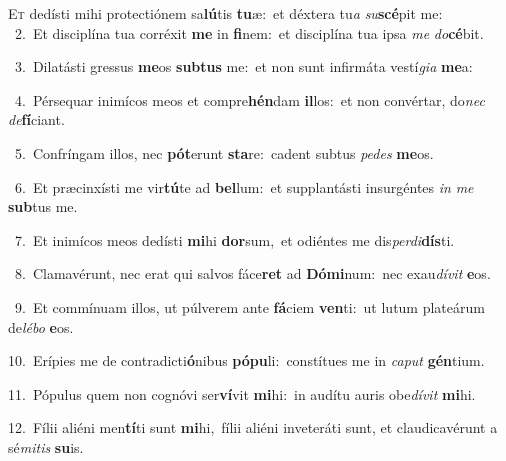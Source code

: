 \lettrine{\initial\textcolor{\initialcolor}{E}}{t} dedísti mihi protectiónem sa\-\textbf{lú}\-tis \textbf{tu}\-æ:~\star et déxtera tu\textit{a} \textit{su}\-\textbf{scé}pit me:\\
{\numbfont\textcolor{\numbcolor}{~2.}}~Et disciplína tua corréxit \textbf{me} in \textbf{fi}\-nem:~\star et disciplína tua ipsa \textit{me} \textit{do}\-\textbf{cé}bit.\par
{\numbfont\textcolor{\numbcolor}{~3.}}~Dilatásti gressus \textbf{me}\-os \textbf{sub}\-\textbf{tus} me:~\star et non sunt infirmáta vestí\-\textit{gi}\-\textit{a} \textbf{me}\-a:\par
{\numbfont\textcolor{\numbcolor}{~4.}}~Pérsequar inimícos meos et compre\-\textbf{hén}\-dam \textbf{il}\-los:~\star et non convértar, do\textit{nec} \textit{de}\-\textbf{fí}ciant.\par
{\numbfont\textcolor{\numbcolor}{~5.}}~Confríngam illos, nec \textbf{pót}\-erunt \textbf{sta}\-re:~\star cadent subtus \textit{pe}\-\textit{des} \textbf{me}\-os.\par
{\numbfont\textcolor{\numbcolor}{~6.}}~Et præcinxísti me vir\-\textbf{tú}\-te ad \textbf{bel}\-lum:~\star et supplantásti insurgéntes \textit{in} \textit{me} \textbf{sub}\-tus me.\par
{\numbfont\textcolor{\numbcolor}{~7.}}~Et inimícos meos dedísti \textbf{mi}\-hi \textbf{dor}\-sum,~\star et odiéntes me dis\-\textit{per}\-\textit{di}\textbf{dís}ti.\par
{\numbfont\textcolor{\numbcolor}{~8.}}~Clamavérunt, nec erat qui salvos fáce\textbf{ret} ad \textbf{Dó}\-\textbf{mi}num:~\star nec exau\-\textit{dí}\-\textit{vit} \textbf{e}\-os.\par
{\numbfont\textcolor{\numbcolor}{~9.}}~Et commínuam illos, ut púlverem ante \textbf{fá}\-ciem \textbf{ven}\-ti:~\star ut lutum plateárum de\-\textit{lé}\-\textit{bo} \textbf{e}\-os.\par
{\numbfont\textcolor{\numbcolor}{10.}}~Erípies me de contradicti\-\textbf{ó}\-nibus \textbf{pó}\-\textbf{pu}li:~\star constítues me in \textit{ca}\-\textit{put} \textbf{gén}\-tium.\par
{\numbfont\textcolor{\numbcolor}{11.}}~Pópulus quem non cognóvi ser\-\textbf{ví}\-vit \textbf{mi}\-hi:~\star in audítu auris obe\-\textit{dí}\-\textit{vit} \textbf{mi}\-hi.\par
{\numbfont\textcolor{\numbcolor}{12.}}~Fílii aliéni men\-\textbf{tí}\-ti sunt \textbf{mi}\-hi,~\star fílii aliéni inveteráti sunt, et claudicavérunt a sé\-\textit{mi}\-\textit{tis} \textbf{su}\-is.\par
